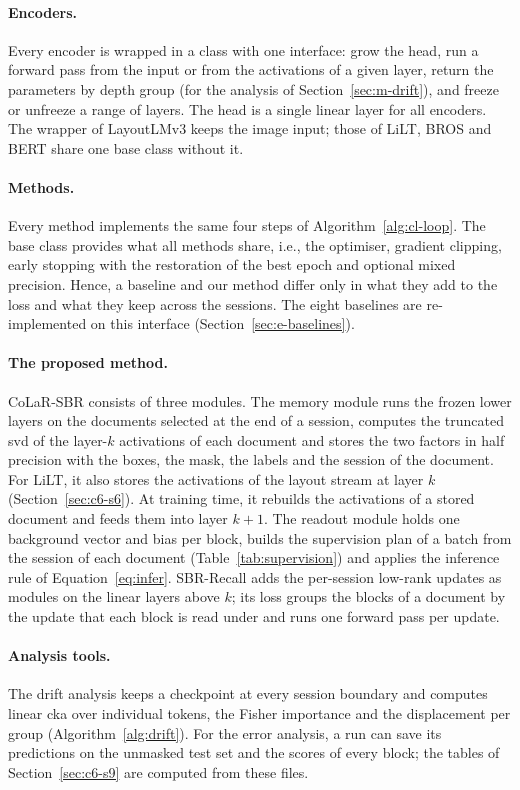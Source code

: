\paragraph{Encoders.} Every encoder is wrapped in a class with one interface: grow the
head, run a forward pass from the input or from the activations of a given layer, return
the parameters by depth group (for the analysis of Section~\ref{sec:m-drift}), and freeze
or unfreeze a range of layers. The head is a single linear layer for all encoders. The
wrapper of LayoutLMv3 keeps the image input; those of LiLT, BROS and BERT share one base
class without it.

\paragraph{Methods.} Every method implements the same four steps of
Algorithm~\ref{alg:cl-loop}. The base class provides what all methods share, i.e., the
optimiser, gradient clipping, early stopping with the restoration of the best epoch and
optional mixed precision. Hence, a baseline and our method differ only in what they add
to the loss and what they keep across the sessions. The eight baselines are
re-implemented on this interface (Section~\ref{sec:e-baselines}).

\paragraph{The proposed method.} CoLaR-SBR consists of three modules. The memory module
runs the frozen lower layers on the documents selected at the end of a session, computes
the truncated \gls{svd} of the layer-$k$ activations of each document and stores the two
factors in half precision with the boxes, the mask, the labels and the session of the
document. For LiLT, it also stores the activations of the layout stream at layer $k$
(Section~\ref{sec:c6-s6}). At training time, it rebuilds the activations of a stored document and feeds
them into layer $k{+}1$. The readout module holds one background vector and bias per
block, builds the supervision plan of a batch from the session of each document
(Table~\ref{tab:supervision}) and applies the inference rule of
Equation~\eqref{eq:infer}. SBR-Recall adds the per-session low-rank updates as modules on
the linear layers above $k$; its loss groups the blocks of a document by the update that
each block is read under and runs one forward pass per update.

\paragraph{Analysis tools.} The drift analysis keeps a checkpoint at every session
boundary and computes linear \gls{cka} over individual tokens, the Fisher importance and
the displacement per group (Algorithm~\ref{alg:drift}). For the error analysis, a run can
save its predictions on the unmasked test set and the scores of every block; the tables of
Section~\ref{sec:c6-s9} are computed from these files.

